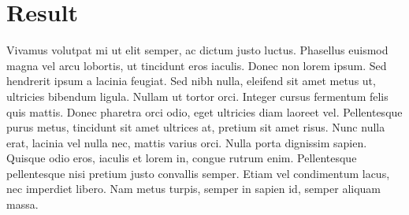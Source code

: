 \section{Result}
Vivamus volutpat mi ut elit semper, ac dictum justo luctus. Phasellus euismod
magna vel arcu lobortis, ut tincidunt eros iaculis. Donec non lorem ipsum. Sed
hendrerit ipsum a lacinia feugiat. Sed nibh nulla, eleifend sit amet metus ut,
ultricies bibendum ligula. Nullam ut tortor orci. Integer cursus fermentum
felis quis mattis. Donec pharetra orci odio, eget ultricies diam laoreet vel.
Pellentesque purus metus, tincidunt sit amet ultrices at, pretium sit amet
risus. Nunc nulla erat, lacinia vel nulla nec, mattis varius orci. Nulla porta
dignissim sapien. Quisque odio eros, iaculis et lorem in, congue rutrum enim.
Pellentesque pellentesque nisi pretium justo convallis semper. Etiam vel
condimentum lacus, nec imperdiet libero. Nam metus turpis, semper in sapien id,
semper aliquam massa.
